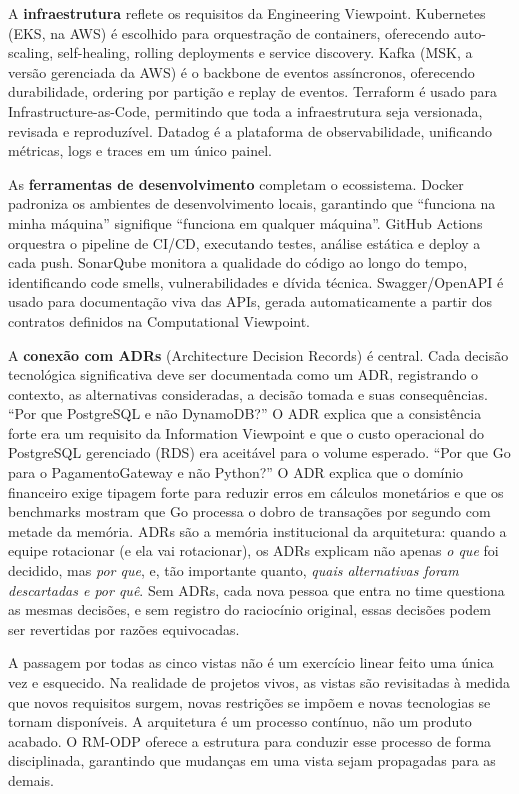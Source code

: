 A \textbf{infraestrutura} reflete os requisitos da Engineering Viewpoint.
Kubernetes (EKS, na AWS) é escolhido para orquestração de containers, oferecendo
auto-scaling, self-healing, rolling deployments e service discovery. Kafka (MSK,
a versão gerenciada da AWS) é o backbone de eventos assíncronos, oferecendo
durabilidade, ordering por partição e replay de eventos. Terraform é usado para
Infrastructure-as-Code, permitindo que toda a infraestrutura seja versionada,
revisada e reproduzível. Datadog é a plataforma de observabilidade, unificando
métricas, logs e traces em um único painel.

As \textbf{ferramentas de desenvolvimento} completam o ecossistema. Docker
padroniza os ambientes de desenvolvimento locais, garantindo que ``funciona na
minha máquina'' signifique ``funciona em qualquer máquina''. GitHub Actions
orquestra o pipeline de CI/CD, executando testes, análise estática e deploy a cada
push. SonarQube monitora a qualidade do código ao longo do tempo, identificando
code smells, vulnerabilidades e dívida técnica. Swagger/OpenAPI é usado para
documentação viva das APIs, gerada automaticamente a partir dos contratos definidos
na Computational Viewpoint.

A \textbf{conexão com ADRs} (Architecture Decision Records) é central. Cada
decisão tecnológica significativa deve ser documentada como um ADR, registrando
o contexto, as alternativas consideradas, a decisão tomada e suas consequências.
``Por que PostgreSQL e não DynamoDB?'' O ADR explica que a consistência forte
era um requisito da Information Viewpoint e que o custo operacional do PostgreSQL
gerenciado (RDS) era aceitável para o volume esperado. ``Por que Go para o
PagamentoGateway e não Python?'' O ADR explica que o domínio financeiro
exige tipagem forte para reduzir erros em cálculos monetários e que os benchmarks
mostram que Go processa o dobro de transações por segundo com metade da memória.
ADRs são a memória institucional da arquitetura: quando a equipe rotacionar (e ela
vai rotacionar), os ADRs explicam não apenas \emph{o que} foi decidido, mas
\emph{por que}, e, tão importante quanto, \emph{quais alternativas foram
descartadas e por quê}. Sem ADRs, cada nova pessoa que entra no time questiona
as mesmas decisões, e sem registro do raciocínio original, essas decisões podem
ser revertidas por razões equivocadas.

A passagem por todas as cinco vistas não é um exercício linear feito uma única vez
e esquecido. Na realidade de projetos vivos, as vistas são revisitadas à medida que
novos requisitos surgem, novas restrições se impõem e novas tecnologias se tornam
disponíveis. A arquitetura é um processo contínuo, não um produto acabado. O RM-ODP
oferece a estrutura para conduzir esse processo de forma disciplinada, garantindo
que mudanças em uma vista sejam propagadas para as demais.


